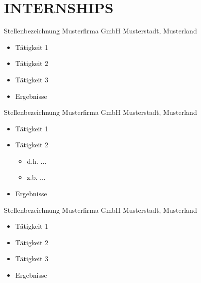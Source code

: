 \section{INTERNSHIPS}

        {Stellenbezeichnung}
        {Musterfirma GmbH}
        {Musterstadt, Musterland}
        {}   %
        {
        \begin{itemize}
            \item Tätigkeit 1
            \item Tätigkeit 2
            \item Tätigkeit 3
            \item Ergebnisse
        \end{itemize}
        }
                
        {Stellenbezeichnung}
        {Musterfirma GmbH}
        {Musterstadt, Musterland}
        {}   %
        {
        \begin{itemize}
            \item Tätigkeit 1
            \item Tätigkeit 2
            \begin{itemize}
                \item d.h. ...
                \item z.b. ...
            \end{itemize}
            \item Ergebnisse
        \end{itemize}
        }


        {Stellenbezeichnung}
        {Musterfirma GmbH}
        {Musterstadt, Musterland}
        {}   %
        {
        \begin{itemize}
            \item Tätigkeit 1
            \item Tätigkeit 2
            \item Tätigkeit 3
            \item Ergebnisse
        \end{itemize}
        }


